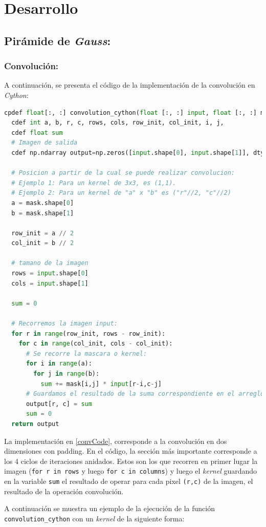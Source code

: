 \documentclass[12pt, letterpaper]{article}
\begin{document}
\newpage
\section{Desarrollo}
\subsection{Pirámide de \textit{Gauss}:}

\subsubsection*{Convolución:}
\par A continuación, se presenta el código de la implementación de la convolución en \textit{Cython}:

\begin{lstlisting}[language=Python, label = convCode, caption=Implementación de convolución en Cython.]
  cpdef float[:, :] convolution_cython(float [:, :] input, float [:, :] mask):
  cdef int a, b, r, c, rows, cols, row_init, col_init, i, j,
  cdef float sum
  # Imagen de salida
  cdef np.ndarray output=np.zeros([input.shape[0], input.shape[1]], dtype = np.float32)

  # Posicion a partir de la cual se puede realizar convolucion: 
  # Ejemplo 1: Para un kernel de 3x3, es (1,1).
  # Ejemplo 2: Para un kernel de "a" x "b" es ("r"//2, "c"//2)
  a = mask.shape[0]
  b = mask.shape[1]

  row_init = a // 2
  col_init = b // 2

  # tamano de la imagen
  rows = input.shape[0]
  cols = input.shape[1]

  sum = 0

  # Recorremos la imagen input:
  for r in range(row_init, rows - row_init):
    for c in range(col_init, cols - col_init):
      # Se recorre la mascara o kernel:
      for i in range(a):
        for j in range(b):
          sum += mask[i,j] * input[r-i,c-j]
      # Guardamos el resultado de la suma correspondiente en el arreglo output:
      output[r, c] = sum
      sum = 0
  return output
\end{lstlisting}

\par La implementación en \ref{convCode}, corresponde a la convolución en dos dimensiones con padding. En el código, la sección más importante corresponde a los 4 ciclos de iteraciones anidados. Estos son los que recorren en primer lugar la imagen (\texttt{for r in rows} y luego \texttt{for c in columns}) y luego el \textit{kernel} guardando en la variable \texttt{sum} el resultado de operar para cada pixel \texttt{(r,c)} de la imagen, el resultado de la operación convolución. 
\par A continuación se muestra un ejemplo de la ejecución de la función \texttt{convolution\_cython} con un \textit{kernel} de la siguiente forma:
\end{document}
